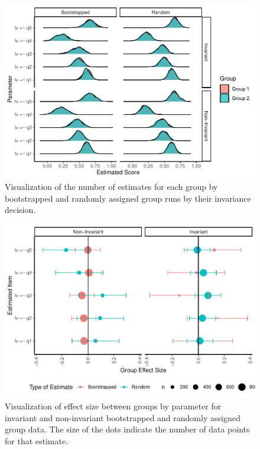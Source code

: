 \documentclass[
  man]{apa7}
\begin{document}
\begin{figure}
\centering
\includegraphics{manuscript_files/figure-latex/density-partial-fig-1.pdf}
\caption{\label{fig:density-partial-fig}Visualization of the number of estimates for each group by bootstrapped and randomly assigned group runs by their invariance decision.}
\end{figure}

\begin{figure}
\centering
\includegraphics{manuscript_files/figure-latex/effect-partial-fig-1.pdf}
\caption{\label{fig:effect-partial-fig}Visualization of effect size between groups by parameter for invariant and non-invariant bootstrapped and randomly assigned group data. The size of the dots indicate the number of data points for that estimate.}
\end{figure}
\end{document}
